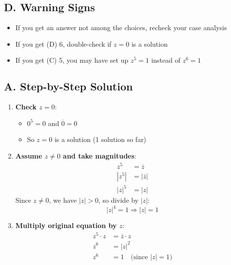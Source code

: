 \documentclass[11pt]{article}
\begin{document}
\begin{pitfallbox}
\subsection*{D. Warning Signs}
\begin{itemize}[leftmargin=*]
    \item If you get an answer not among the choices, recheck your case analysis
    \item If you get (D) 6, double-check if $z = 0$ is a solution
    \item If you get (C) 5, you may have set up $z^5 = 1$ instead of $z^6 = 1$
\end{itemize}
\end{pitfallbox}

\begin{solutionbox}
\subsection*{A. Step-by-Step Solution}
\begin{enumerate}[leftmargin=*]
    \item \textbf{Check $z = 0$}: 
    \begin{itemize}
        \item $0^5 = 0$ and $\overline{0} = 0$
        \item So $z = 0$ is a solution (1 solution so far)
    \end{itemize}
    
    \item \textbf{Assume $z \neq 0$ and take magnitudes}:
    \begin{align*}
    z^5 &= \overline{z}\\
    |z^5| &= |\overline{z}|\\
    |z|^5 &= |z|
    \end{align*}
    Since $z \neq 0$, we have $|z| > 0$, so divide by $|z|$:
    \[|z|^4 = 1 \Rightarrow |z| = 1\]
    
    \item \textbf{Multiply original equation by $z$}:
    \begin{align*}
    z^5 \cdot z &= \overline{z} \cdot z\\
    z^6 &= |z|^2\\
    z^6 &= 1 \quad \text{(since } |z| = 1 \text{)}
    \end{align*}
    

\end{enumerate}
\end{solutionbox}
\end{document}
